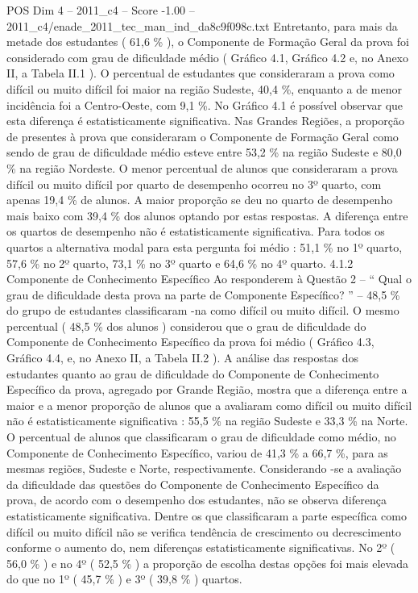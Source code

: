 \begin{textsample}{POS Dim 4 – 2011\_c4 – Score -1.00 – 2011\_c4/enade\_2011\_tec\_man\_ind\_da8c9f098c.txt}
Entretanto, para mais da metade dos estudantes ( 61,6 \% ), o Componente de Formação Geral da prova foi considerado com grau de dificuldade médio ( Gráfico 4.1, Gráfico 4.2 e, no Anexo II, a Tabela II.1 ).
O percentual de estudantes que consideraram a prova como difícil ou muito difícil foi maior na região Sudeste, 40,4 \%, enquanto a de menor incidência foi a Centro-Oeste, com 9,1 \%.
No Gráfico 4.1 é possível observar que esta diferença é estatisticamente significativa.
Nas Grandes Regiões, a proporção de presentes à prova que consideraram o Componente de Formação Geral como sendo de grau de dificuldade médio esteve entre 53,2 \% na região Sudeste e 80,0 \% na região Nordeste.
O menor percentual de alunos que consideraram a prova difícil ou muito difícil por quarto de desempenho ocorreu no 3º quarto, com apenas 19,4 \% de alunos.
A maior proporção se deu no quarto de desempenho mais baixo com 39,4 \% dos alunos optando por estas respostas.
A diferença entre os quartos de desempenho não é estatisticamente significativa.
Para todos os quartos a alternativa modal para esta pergunta foi médio : 51,1 \% no 1º quarto, 57,6 \% no 2º quarto, 73,1 \% no 3º quarto e 64,6 \% no 4º quarto. 4.1.2 Componente de Conhecimento Específico Ao responderem à Questão 2 – “ Qual o grau de dificuldade desta prova na parte de Componente Específico? ” – 48,5 \% do grupo de estudantes classificaram -na como difícil ou muito difícil.
O mesmo percentual ( 48,5 \% dos alunos ) considerou que o grau de dificuldade do Componente de Conhecimento Específico da prova foi médio ( Gráfico 4.3, Gráfico 4.4, e, no Anexo II, a Tabela II.2 ).
A análise das respostas dos estudantes quanto ao grau de dificuldade do Componente de Conhecimento Específico da prova, agregado por Grande Região, mostra que a diferença entre a maior e a menor proporção de alunos que a avaliaram como difícil ou muito difícil não é estatisticamente significativa : 55,5 \% na região Sudeste e 33,3 \% na Norte.
O percentual de alunos que classificaram o grau de dificuldade como médio, no Componente de Conhecimento Específico, variou de 41,3 \% a 66,7 \%, para as mesmas regiões, Sudeste e Norte, respectivamente.
Considerando -se a avaliação da dificuldade das questões do Componente de Conhecimento Específico da prova, de acordo com o desempenho dos estudantes, não se observa diferença estatisticamente significativa.
Dentre os que classificaram a parte específica como difícil ou muito difícil não se verifica tendência de crescimento ou decrescimento conforme o aumento do, nem diferenças estatisticamente significativas.
No 2º ( 56,0 \% ) e no 4º ( 52,5 \% ) a proporção de escolha destas opções foi mais elevada do que no 1º ( 45,7 \% ) e 3º ( 39,8 \% ) quartos.

\end{textsample}
